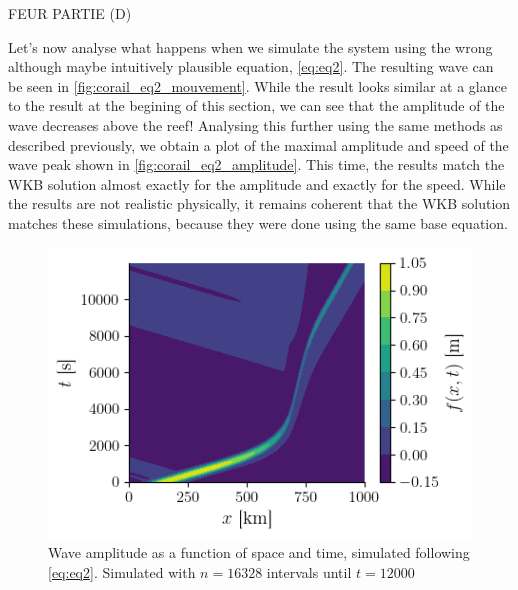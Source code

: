 FEUR PARTIE (D)

Let's now analyse what happens when we simulate the system using the wrong although maybe intuitively plausible equation, \autoref{eq:eq2}. The resulting wave can be seen in \autoref{fig:corail_eq2_mouvement}. While the result looks similar at a glance to the result at the begining of this section, we can see that the amplitude of the wave decreases above the reef! Analysing this further using the same methods as described previously, we obtain a plot of the maximal amplitude and speed of the wave peak shown in \autoref{fig:corail_eq2_amplitude}. This time, the results match the WKB solution almost exactly for the amplitude and exactly for the speed. While the results are not realistic physically, it remains coherent that the WKB solution matches these simulations, because they were done using the same base equation.

\begin{figure}[h]
    \centering
    \includegraphics[width=0.6\linewidth]{figures/corail_eq2_mouvement_vague.png}
    \caption{Wave amplitude as a function of space and time, simulated following \autoref{eq:eq2}. Simulated with \(n=16328\) intervals until \(t=12000\)}
    \label{fig:corail_eq2_mouvement}
\end{figure}

